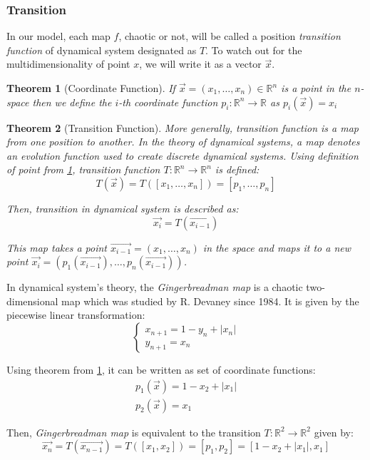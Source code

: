 \documentclass[twocolumn, a4paper, 10pt]{article}
\newtheorem{theorem}{Theorem}[section]
\begin{document}
\subsubsection{Transition}

In our model, each map $f$, chaotic or not, will be called a position \textit{transition function} of dynamical system designated as $T$. To watch out for the multidimensionality of point $x$, we will write it as a vector $\vec{x}$.

\begin{theorem}
[Coordinate Function]
\label{coordinate-function}\hfill\break
If $\vec{x} = (x_1, \dots, x_n) \in \mathbb{R}^n$ is a point in the $n$-space then we define the $i$-th coordinate function $p_i : \mathbb{R}^n \to \mathbb{R}$ as $p_i(\vec{x}) = x_i$
\end{theorem}

\begin{theorem}
[Transition Function]
\label{transition-function}\hfill\break
More generally, transition function is a map from one position to another. In the theory of dynamical systems, a map denotes an evolution function used to create discrete dynamical systems. Using definition of point from \ref{coordinate-function}, transition function $T : \mathbb{R}^n \to \mathbb{R}^n$ is defined: $$T(\vec{x}) = T([x_1, \dots, x_n]) = [p_1, \dots, p_n]$$

Then, transition in dynamical system is described as: $$\vec{x_i} = T(\vec{x_{i-1}})$$

This map takes a point $\vec{x_{i-1}} = (x_1, \dots, x_n)$ in the space and maps it to a new point $\vec{x_i} = (p_1(\vec{x_{i-1}}), \dots, p_n(\vec{x_{i-1}}))$.
\end{theorem}

In dynamical system's theory, the \textit{Gingerbreadman map} is a chaotic two-dimensional map which was studied by R. Devaney \cite{Devaney1984} since 1984. It is given by the piecewise linear transformation: $$\begin{cases} x_{n+1} = 1 - y_n + |x_n| \\ y_{n+1} = x_n \end{cases}$$

Using theorem from \ref{coordinate-function}, it can be written as set of coordinate functions: \begin{gather} p_1(\vec{x}) = 1 - x_2 + |x_1| \\ p_2(\vec{x}) = x_1 \end{gather}

Then, \textit{Gingerbreadman map} is equivalent to the transition $T : \mathbb{R}^2 \to \mathbb{R}^2$ given by: $$\vec{x_n} = T(\vec{x_{n-1}}) = T([x_1, x_2]) = [p_1, p_2] = [1 - x_2 + |x_1|, x_1]$$
\end{document}
